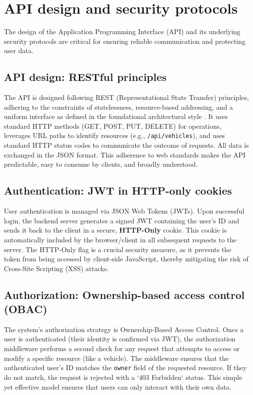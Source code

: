 \section{API design and security protocols}

The design of the Application Programming Interface (API) and its underlying security protocols are critical for ensuring reliable communication and protecting user data.

\subsection{API design: RESTful principles}
The API is designed following REST (Representational State Transfer) principles, adhering to the constraints of statelessness, resource-based addressing, and a uniform interface as defined in the foundational architectural style \cite{Fielding2000REST}. It uses standard HTTP methods (GET, POST, PUT, DELETE) for operations, leverages URL paths to identify resources (e.g., \texttt{/api/vehicles}), and uses standard HTTP status codes to communicate the outcome of requests. All data is exchanged in the JSON format. This adherence to web standards makes the API predictable, easy to consume by clients, and broadly understood.

\subsection{Authentication: JWT in HTTP-only cookies}
User authentication is managed via JSON Web Tokens (JWTs). Upon successful login, the backend server generates a signed JWT containing the user's ID and sends it back to the client in a secure, \textbf{HTTP-Only} cookie. This cookie is automatically included by the browser/client in all subsequent requests to the server. The HTTP-Only flag is a crucial security measure, as it prevents the token from being accessed by client-side JavaScript, thereby mitigating the risk of Cross-Site Scripting (XSS) attacks.

\subsection{Authorization: Ownership-based access control (OBAC)}
The system's authorization strategy is Ownership-Based Access Control. Once a user is authenticated (their identity is confirmed via JWT), the authorization middleware performs a second check for any request that attempts to access or modify a specific resource (like a vehicle). The middleware ensures that the authenticated user's ID matches the \texttt{owner} field of the requested resource. If they do not match, the request is rejected with a `403 Forbidden` status. This simple yet effective model ensures that users can only interact with their own data.

